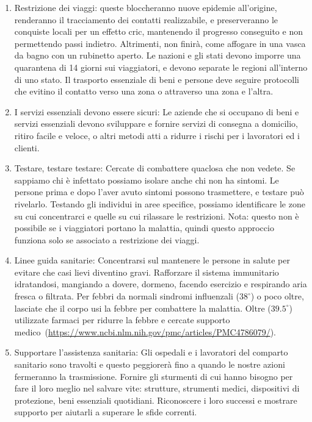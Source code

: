 \documentclass[onecolumn,journal]{IEEEtran}
\begin{document}
\begin{multicols}{2}
\begin{enumerate}
\item Restrizione dei viaggi: queste bloccheranno nuove epidemie all'origine, renderanno il tracciamento dei contatti realizzabile, e preserveranno le conquiste locali per un effetto cric, mantenendo il progresso conseguito e non permettendo passi indietro. Altrimenti, non finirà, come affogare in una vasca da bagno con un rubinetto aperto. Le nazioni e gli stati devono imporre una quarantena di 14 giorni sui viaggiatori, e devono separate le regioni all'interno di uno stato. Il trasporto essenziale di beni e persone deve seguire protocolli che evitino il contatto verso una zona o attraverso una zona e l'altra.

\item I servizi essenziali devono essere sicuri: Le aziende che si occupano di beni e servizi essenziali devono sviluppare e fornire servizi di consegna a domicilio, ritiro facile e veloce, o altri metodi atti a ridurre i rischi per i lavoratori ed i clienti.

\item Testare, testare testare: Cercate di combattere quaclosa che non vedete. Se sappiamo chi è infettato possiamo isolare anche chi non ha sintomi. Le persone prima e dopo l'aver avuto sintomi possono trasmettere, e testare può rivelarlo. Testando gli individui in aree specifice, possiamo identificare le zone su cui concentrarci e quelle su cui rilassare le restrizioni. Nota: questo non è possibile se i viaggiatori portano la malattia, quindi questo approccio funziona solo se associato a restrizione dei viaggi.

\item Linee guida sanitarie: Concentrarsi sul mantenere le persone in salute per evitare che casi lievi diventino gravi. Rafforzare il sistema immunitario idratandosi, mangiando a dovere, dormeno, facendo esercizio e respirando aria fresca o filtrata. Per febbri da normali sindromi influenzali ($38^\circ$) o poco oltre, lasciate che il corpo usi la febbre per combattere la malattia. Oltre ($39.5^\circ$) utilizzate farmaci per ridurre la febbre e cercate supporto medico~(\url{https://www.ncbi.nlm.nih.gov/pmc/articles/PMC4786079/}).

\item Supportare l'assistenza sanitaria: Gli ospedali e i lavoratori del comparto sanitario sono travolti e questo peggiorerà fino a quando le nostre azioni fermeranno la trasmissione. Fornire gli sturmenti di cui hanno bisogno per fare il loro meglio nel salvare vite: strutture, strumenti medici, dispositivi di protezione, beni essenziali quotidiani. Riconoscere i loro successi e mostrare supporto per aiutarli a superare le sfide correnti.

\end{enumerate}

\end{multicols}




% 
\end{document}
